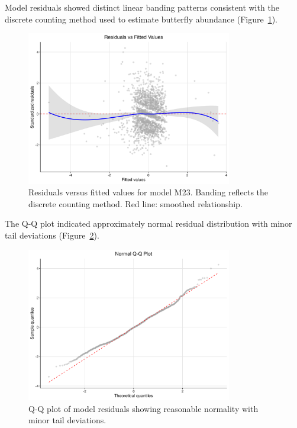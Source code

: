 Model residuals showed distinct linear banding patterns consistent with the discrete counting method used to estimate butterfly abundance (Figure~\ref{fig:residuals}).

\begin{figure}[htbp]
\centering
\includegraphics[width=0.8\textwidth]{supplemental/results/thesis_exports/figures/residuals_vs_fitted.png}
\caption{Residuals versus fitted values for model M23. Banding reflects the discrete counting method. Red line: smoothed relationship.}\label{fig:residuals}
\end{figure}

The Q-Q plot indicated approximately normal residual distribution with minor tail deviations (Figure~\ref{fig:qqplot}).

\begin{figure}[htbp]
\centering
\includegraphics[width=0.8\textwidth]{supplemental/results/thesis_exports/figures/qq_plot.png}
\caption{Q-Q plot of model residuals showing reasonable normality with minor tail deviations.}\label{fig:qqplot}
\end{figure}

